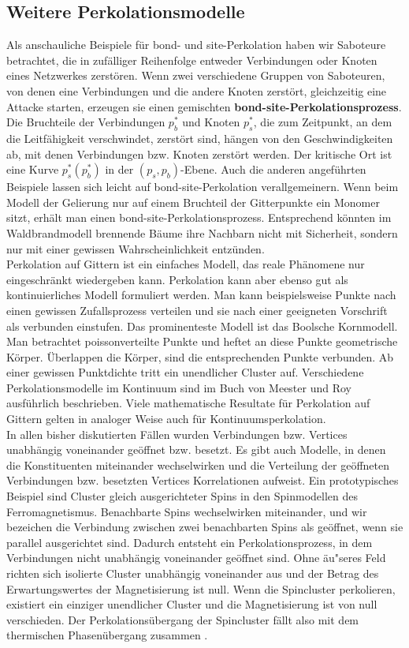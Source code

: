 \subsection{Weitere Perkolationsmodelle}
Als anschauliche Beispiele f\"ur bond- und site-Perkolation haben wir Saboteure betrachtet, die in zuf\"alliger Reihenfolge entweder Verbindungen oder Knoten eines Netzwerkes zerst\"oren. Wenn zwei verschiedene Gruppen von Saboteuren, von denen eine Verbindungen und die andere Knoten zerst\"ort, gleichzeitig eine Attacke starten, erzeugen sie einen gemischten \textbf{bond-site-Perkolationsprozess}. Die Bruchteile der Verbindungen $p_b^*$ und Knoten $p_s^*$, die zum Zeitpunkt, an dem die Leitf\"ahigkeit verschwindet, zerst\"ort sind, h\"angen von den Geschwindigkeiten ab, mit denen Verbindungen bzw. Knoten zerst\"ort werden. Der kritische Ort ist eine Kurve $p_s^*(p_b^*)$ in der $(p_s,p_b)$-Ebene. Auch die anderen angef\"uhrten Beispiele lassen sich leicht auf bond-site-Perkolation verallgemeinern. Wenn beim Modell der Gelierung nur auf einem Bruchteil der Gitterpunkte ein Monomer sitzt, erh\"alt man einen bond-site-Perkolationsprozess. Entsprechend k\"onnten im Waldbrandmodell brennende B\"aume ihre Nachbarn nicht mit Sicherheit, sondern nur mit einer gewissen Wahrscheinlichkeit entz\"unden.\\
Perkolation auf Gittern ist ein einfaches Modell, das reale Ph\"anomene nur eingeschr\"ankt wiedergeben kann. Perkolation kann aber ebenso gut als kontinuierliches Modell formuliert werden. Man kann beispielsweise Punkte nach einen gewissen Zufallsprozess verteilen und sie nach einer geeigneten Vorschrift als verbunden einstufen. Das prominenteste Modell ist das Boolsche Kornmodell. Man betrachtet poissonverteilte Punkte und heftet an diese Punkte geometrische K\"orper. \"Uberlappen die K\"orper, sind die entsprechenden Punkte verbunden. Ab einer gewissen Punktdichte tritt ein unendlicher Cluster auf. Verschiedene Perkolationsmodelle im Kontinuum sind im Buch von Meester und Roy \cite{Meester:96} ausf\"uhrlich beschrieben. Viele mathematische Resultate f\"ur Perkolation auf Gittern gelten in analoger Weise auch f\"ur Kontinuumsperkolation. \\
In allen bisher diskutierten F\"allen wurden Verbindungen bzw. Vertices unabh\"angig voneinander ge\"offnet bzw. besetzt. Es gibt auch Modelle, in denen die Konstituenten miteinander wechselwirken und die Verteilung der ge\"offneten Verbindungen bzw. besetzten Vertices Korrelationen aufweist. Ein prototypisches Beispiel sind Cluster gleich ausgerichteter Spins in den Spinmodellen des Ferromagnetismus. Benachbarte Spins wechselwirken miteinander, und wir bezeichen die Verbindung zwischen zwei benachbarten Spins als ge\"offnet, wenn sie parallel ausgerichtet sind. Dadurch entsteht ein Perkolationsprozess, in dem Verbindungen nicht unabh\"angig voneinander ge\"offnet sind. Ohne \"au"seres Feld richten sich isolierte Cluster unabh\"angig voneinander aus und der Betrag des Erwartungswertes der Magnetisierung ist null. Wenn die Spincluster perkolieren, existiert ein einziger unendlicher Cluster und die Magnetisierung ist von null verschieden. Der Perkolations\"ubergang der Spincluster f\"allt also mit dem thermischen Phasen\"ubergang zusammen \cite{Coniglio:77}.\\
